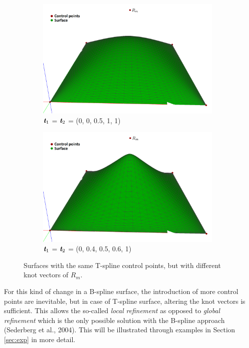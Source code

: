 \documentclass{article}
\begin{document}
\begin{figure}[H]
\centering
\begin{subfigure}[b]{0.48\textwidth}
\includegraphics[width=\textwidth]{tsplineex1}
\caption{$\emph{\textbf{t}}_1$ = $\emph{\textbf{t}}_2$ = (0, 0, 0.5, 1, 1)}
\label{tsplineex2}
\end{subfigure}
\begin{subfigure}[b]{0.48\textwidth}
\includegraphics[width=\textwidth]{tsplineex2}
\caption{$\emph{\textbf{t}}_1$ = $\emph{\textbf{t}}_2$ = (0, 0.4, 0.5, 0.6, 1)}
\label{tsplineex2}
\end{subfigure}
\caption{Surfaces with the same T-spline control points, but with different knot vectors of $R_m$.}
\label{tsplineexs}
\end{figure}

For this kind of change in a B-spline surface, the introduction of more control points are inevitable, but in case of T-spline surface, altering the knot vectors is sufficient. This allows the so-called \emph{local refinement} as opposed to \emph{global refinement} which is the only possible solution with the B-spline approach (Sederberg et al., 2004). This will be illustrated through examples in Section \ref{sec:exp} in more detail.
\end{document}
